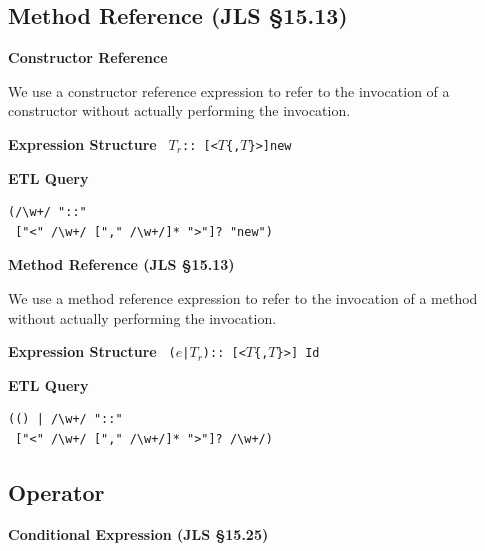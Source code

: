 \begin{chapterBody}
\subsection*{Method Reference (JLS \S15.13)}

\noindent\textbf{Constructor Reference}

We use a constructor reference expression to refer to the invocation of a
constructor without actually performing the invocation.
\vspace{1em}

\begin{minipage}[t]{.45\linewidth}
\textbf{Expression Structure} \hfill\break
\texttt{
$T_r${\color{bp-blue}::}
\hfill\break\hspace*{0.25em}
[{\color{bp-blue}<}$T$\{,$T$\}{\color{bp-blue}>}]{\color{bp-blue}new}
}
\end{minipage}
\begin{minipage}[t]{.45\linewidth}
\textbf{ETL Query}
\begin{lstlisting}[language=etl]
(/\w+/ "::"
 ["<" /\w+/ ["," /\w+/]* ">"]? "new")
\end{lstlisting}
\end{minipage}

\noindent\textbf{Method Reference (JLS \S15.13)}

We use a method reference expression to refer to the invocation of a method 
without actually performing the invocation.
\vspace{1em}

\begin{minipage}[t]{.45\linewidth}
\textbf{Expression Structure} \hfill\break
\texttt{
($e$|$T_r$){\color{bp-blue}::}
\hfill\break\hspace*{0.25em}
[{\color{bp-blue}<}$T$\{,$T$\}{\color{bp-blue}>}] Id
}
\end{minipage}
\begin{minipage}[t]{.45\linewidth}
\textbf{ETL Query}
\begin{lstlisting}[language=etl]
(() | /\w+/ "::"
 ["<" /\w+/ ["," /\w+/]* ">"]? /\w+/)
\end{lstlisting}
\end{minipage}

\subsection*{Operator}

\noindent\textbf{Conditional Expression (JLS \S15.25)}


\end{chapterBody}

